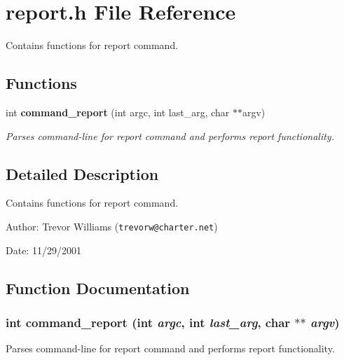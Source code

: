 \section{report.h File Reference}
\label{report_8h}
Contains functions for report command.  


\subsection*{Functions}
\begin{CompactItemize}
\item 
int {\bf command\_\-report} (int argc, int last\_\-arg, char $\ast$$\ast$argv)
\begin{CompactList}\small\item\em Parses command-line for report command and performs report functionality. \item\end{CompactList}\end{CompactItemize}


\subsection{Detailed Description}
Contains functions for report command. 

\begin{Desc}
\item[Author:]Trevor Williams ({\tt trevorw@charter.net}) \end{Desc}
\begin{Desc}
\item[Date:]11/29/2001 \end{Desc}


\subsection{Function Documentation}
\subsubsection{\setlength{\rightskip}{0pt plus 5cm}int command\_\-report (int {\em argc}, int {\em last\_\-arg}, char $\ast$$\ast$ {\em argv})}\label{report_8h_a0}


Parses command-line for report command and performs report functionality. 

